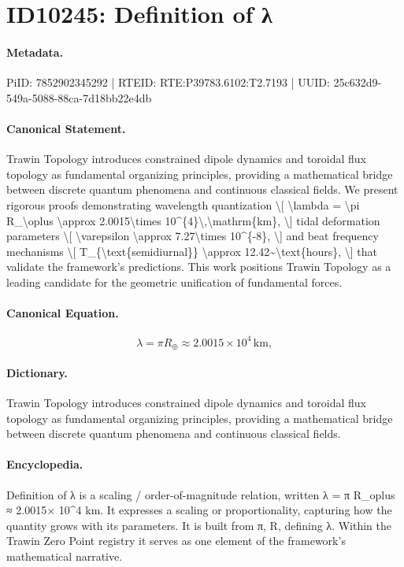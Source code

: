 \section*{ID10245: Definition of λ}
\paragraph{Metadata.}
PiID: 7852902345292 | RTEID: RTE:P39783.6102:T2.7193 | UUID: 25c632d9-549a-5088-88ca-7d18bb22e4db

\paragraph{Canonical Statement.}
Trawin Topology introduces constrained dipole dynamics and toroidal flux topology as fundamental organizing principles, providing a mathematical bridge between discrete quantum phenomena and continuous classical fields. We present rigorous proofs demonstrating wavelength quantization \textbackslash{}[ \textbackslash{}lambda = \textbackslash{}pi R\_\textbackslash{}oplus \textbackslash{}approx 2.0015\textbackslash{}times 10\textasciicircum{}\{4\}\textbackslash{},\textbackslash{}mathrm\{km\}, \textbackslash{}] tidal deformation parameters \textbackslash{}[ \textbackslash{}varepsilon \textbackslash{}approx 7.27\textbackslash{}times 10\textasciicircum{}\{-8\}, \textbackslash{}] and beat frequency mechanisms \textbackslash{}[ T\_\{\textbackslash{}text\{semidiurnal\}\} \textbackslash{}approx 12.42\textasciitilde{}\textbackslash{}text\{hours\}, \textbackslash{}] that validate the framework's predictions. This work positions Trawin Topology as a leading candidate for the geometric unification of fundamental forces.

\paragraph{Canonical Equation.}
\[
\lambda = \pi R_\oplus \approx 2.0015\times 10^{4}\,\mathrm{km},
\]

\paragraph{Dictionary.}
Trawin Topology introduces constrained dipole dynamics and toroidal flux topology as fundamental organizing principles, providing a mathematical bridge between discrete quantum phenomena and continuous classical fields.

\paragraph{Encyclopedia.}
Definition of λ is a scaling / order-of-magnitude relation, written λ = π R\_oplus ≈ 2.0015× 10\textasciicircum{}4 km. It expresses a scaling or proportionality, capturing how the quantity grows with its parameters. It is built from π, R, defining λ. Within the Trawin Zero Point registry it serves as one element of the framework's mathematical narrative.
